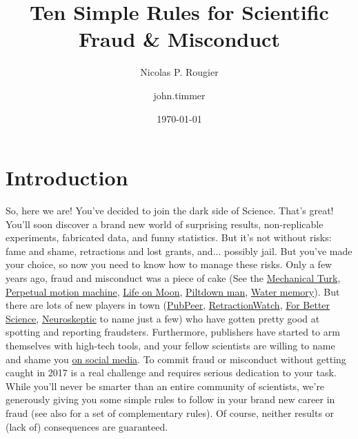 \documentclass[11pt,letter]{article}
\providecommand\citep{\cite}
\begin{document}
\title{Ten Simple Rules for Scientific Fraud \& Misconduct}



\author[1]{Nicolas P. Rougier}%
\author[1]{john.timmer}%
%


\vspace{-1em}



  \date{\today}


\begingroup
\let\center\flushleft
\let\endcenter\endflushleft
\maketitle
\endgroup








\section*{Introduction}

So, here we are! You've decided to join the dark side of Science. That's great!
You'll soon discover a brand new world of surprising results,
non-replicable experiments, fabricated data, and funny statistics. But it's not without risks: fame and shame,
retractions and lost grants, and... possibly jail. But you've made your choice, so now you need to know how to manage these risks. Only a few years ago, fraud and misconduct was a piece of
cake (See the \href{https://en.wikipedia.org/wiki/The_Turk}{Mechanical Turk},
\href{https://en.wikipedia.org/wiki/Charles_Redheffer}{Perpetual motion
  machine}, \href{https://en.wikipedia.org/wiki/Great_Moon_Hoax}{Life on Moon},
\href{https://en.wikipedia.org/wiki/Piltdown_Man}{Piltdown man},
\href{https://en.wikipedia.org/wiki/Water_memory}{Water memory}). But there are lots of new players in town (\href{https://pubpeer.com}{PubPeer},
\href{http://retractionwatch.com}{RetractionWatch},
\href{https://forbetterscience.com}{For Better Science},
\href{http://blogs.discovermagazine.com/neuroskeptic/}{Neuroskeptic} to name
just a few) who have gotten pretty good at spotting and reporting fraudsters.
Furthermore, publishers have started to arm themselves with high-tech tools, and your fellow scientists are willing to name and shame you \href{https://www.youtube.com/watch?v=FXaOqwanWnU/}{on social media}. To
commit fraud or misconduct without getting caught in 2017 is a real
challenge and requires serious dedication to your task. While you'll never be smarter than an entire community of scientists, we're generously giving you some
simple rules to follow in your brand new career in fraud (see also \citep{timmer:2012}
for a set of complementary rules). Of course, neither results or (lack of) consequences are 
guaranteed.
\end{document}
